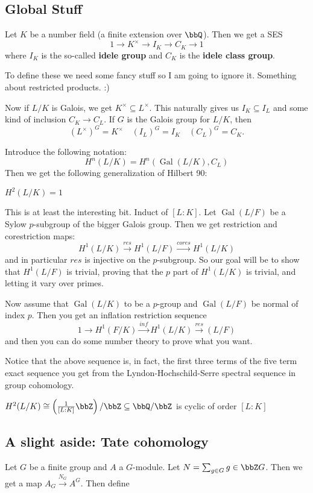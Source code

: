 \documentclass[12pt]{article}
\begin{document}
\subsection{Global Stuff}
Let $K$ be a number field (a finite extension over $\bbQ$). Then we get a SES 
\[1\to K^\times\to I_K\to C_K\to 1\]
where $I_K$ is the so-called \textbf{idele group} and $C_K$ is the \textbf{idele class group}. 

To define these we need some fancy stuff so I am going to ignore it. Something about restricted products. :)

Now if $L/K$ is Galois, we get $K^\times\subseteq L^\times$. This naturally gives us $I_K\subseteq I_L$ and some kind of inclusion $C_K\to C_L$.
If $G$ is the Galois group for $L/K$, then 
\[(L^\times)^G=K^\times\quad (I_L)^G=I_K\quad (C_L)^G=C_K.\]

Introduce the following notation:
\[H^n(L/K)=H^n(\operatorname{Gal}(L/K),C_L)\]
Then we get the following generalization of Hilbert 90:
\begin{thm}
	$H^2(L/K)=1$
\end{thm}
\begin{prf}
	This is at least the interesting bit. Induct of $[L:K]$. Let $\operatorname{Gal}(L/F)$ be a Sylow $p$-subgroup 
	of the bigger Galois group. Then we get restriction and corestriction maps:
	\[H^1(L/K)\xrightarrow{res}H^1(L/F)\xrightarrow{cores}H^1(L/K)\]
	and in particular $res$ is injective on the $p$-subgroup. So our goal will be to show that $H^1(L/F)$ is trivial, 
	proving that the $p$ part of $H^1(L/K)$ is trivial, and letting it vary over primes.

	Now assume that $\operatorname{Gal}(L/K)$ to be a $p$-group and $\operatorname{Gal}(L/F)$ be normal of index $p$.
	Then you get an inflation restriction sequence 
	\[1\to H^1(F/K)\xrightarrow{inf}H^1(L/K)\xrightarrow{res}(L/F)\]
	and then you can do some number theory to prove what you want.
\end{prf}
\begin{rmk}
	Notice that the above sequence is, in fact, the first three terms of the five term exact sequence you get from the Lyndon-Hochschild-Serre
	spectral sequence in group cohomology.
\end{rmk}

\begin{thm}
	$H^2(L/K)\cong\left(\frac{1}{[L:K]}\bbZ\right)/\bbZ\subseteq \bbQ/\bbZ$ is cyclic of order $[L:K]$
\end{thm}

\subsection{A slight aside: Tate cohomology}
Let $G$ be a finite group and $A$ a $G$-module. Let $N=\sum_{g\in G} g\in\bbZ G$. Then we get a map 
$A_G\xrightarrow{N_G}A^G$. Then define 
\end{document}
